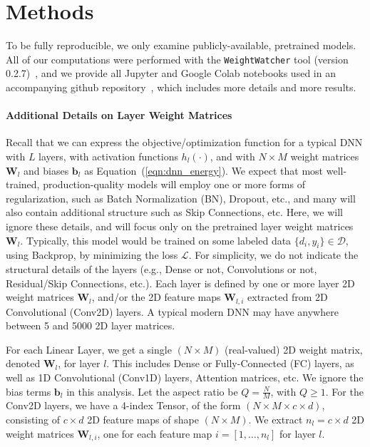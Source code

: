 \section{Methods}
\label{sxn:methods}


To be fully reproducible, we only examine publicly-available, pretrained models.
All of our computations were performed with the \texttt{WeightWatcher} tool (version 0.2.7)~\cite{weightwatcher_package}, and we provide all Jupyter and Google Colab notebooks used in an accompanying github repository~\cite{kdd20_sub_repo}, which includes more details and more results.


\paragraph{Additional Details on Layer Weight Matrices}

Recall that we can express the objective/optimization function for a typical DNN with $L$ layers, with activation functions $h_{l}(\cdot)$, and with $N\times M$ weight matrices $\mathbf{W}_{l}$ and biases $\mathbf{b}_{l}$ as Equation~(\ref{eqn:dnn_energy}).
We expect that most well-trained, production-quality models will employ one or more forms of regularization, such as Batch Normalization (BN), Dropout, etc., and many will also contain additional structure such as Skip Connections, etc. 
Here, we will ignore these details, and will focus only on the pretrained layer weight matrices $\mathbf{W}_{l}$.
Typically, this model would be trained on some labeled data $\{d_{i},y_{i}\}\in\mathcal{D}$, using Backprop, by minimizing the loss $\mathcal{L}$.
For simplicity, we do not indicate the structural details of the layers (e.g., Dense or not, Convolutions or not, Residual/Skip Connections, etc.). 
Each layer is defined by one or more layer 2D weight matrices $\mathbf{W}_{l}$, and/or the 2D feature maps $\mathbf{W}_{l,i}$ extracted from 2D Convolutional (Conv2D) layers.
A typical modern DNN may have anywhere between 5 and 5000 2D layer matrices.

For each Linear Layer, we get a  single $(N\times M)$ (real-valued) 2D weight matrix, denoted $\mathbf{W}_{l}$, for layer $l$.  
This includes Dense or Fully-Connected (FC) layers, as well as 1D Convolutional (Conv1D) layers, Attention matrices, etc.
We ignore the bias terms $\mathbf{b}_{l}$ in this analysis. 
Let the aspect ratio be $Q=\frac{N}{M}$, with $Q\ge 1$.
For the Conv2D layers, we have a 4-index Tensor, of the form $(N\times M \times c\times d)$, consisting
of $c\times d$ 2D feature maps of shape $(N\times M)$.    
We  extract $n_{l}=c\times d$ 2D weight matrices $\mathbf{W}_{l,i}$, one for each feature map $i=[1,\dots,n_{l}]$ for layer $l$.


